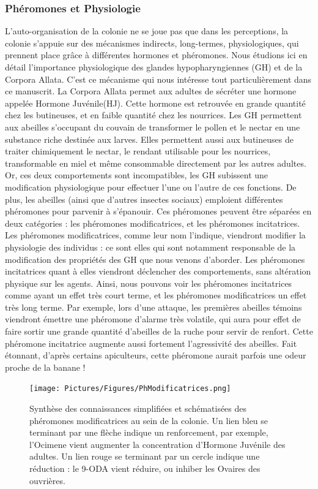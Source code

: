 		\subsubsection{Phéromones et Physiologie}
			\label{subsubPhysio}
			L'auto-organisation de la colonie ne se joue pas que dans les perceptions, la colonie s'appuie sur des mécanismes indirects, long-termes, physiologiques, qui prennent place grâce à différentes hormones et phéromones.  Nous étudions ici en détail l'importance physiologique des glandes hypopharyngiennes (GH) et de la Corpora Allata. C'est ce mécanisme qui nous intéresse tout particulièrement dans ce manuscrit. La Corpora Allata permet aux adultes de sécréter une hormone appelée Hormone Juvénile(HJ). Cette hormone est retrouvée en grande quantité chez les butineuses, et en faible quantité chez les nourrices. Les GH permettent aux abeilles s'occupant du couvain de transformer le pollen et le nectar en une substance riche destinée aux larves. Elles permettent aussi aux butineuses de traiter chimiquement le nectar, le rendant utilisable pour les nourrices, transformable en miel et même consommable directement par les autres adultes. Or, ces deux comportements sont incompatibles, les GH subissent une modification physiologique pour effectuer l'une ou l'autre de ces fonctions. De plus, les abeilles (ainsi que d'autres insectes sociaux) emploient différentes phéromones pour parvenir à s'épanouir. Ces phéromones peuvent être séparées en deux catégories : les phéromones modificatrices, et les phéromones incitatrices. Les phéromones modificatrices, comme leur nom l'indique, viendront modifier la physiologie des individus : ce sont elles qui sont notamment responsable de la modification des propriétés des GH que nous venons d'aborder. Les phéromones incitatrices quant à elles viendront déclencher des comportements, sans altération physique sur les agents. Ainsi, nous pouvons voir les phéromones incitatrices comme ayant un effet très court terme, et les phéromones modificatrices un effet très long terme. Par exemple, lors d'une attaque, les premières abeilles témoins viendront émettre une phéromone d'alarme très volatile, qui aura pour effet de faire sortir une grande quantité d'abeilles de la ruche pour servir de renfort. Cette phéromone incitatrice augmente aussi fortement l'agressivité des abeilles. Fait étonnant, d'après certains apiculteurs, cette phéromone aurait parfois une odeur proche de la banane !
			
			
			
			
			\begin{figure}
				\texttt{[image: Pictures/Figures/PhModificatrices.png]}
				\caption{Synthèse des connaissances simplifiées et schématisées des phéromones modificatrices au sein de la colonie. Un lien bleu se terminant par une flèche indique un renforcement, par exemple, l'Ocimene vient augmenter la concentration d'Hormone Juvénile des adultes. Un lien rouge se terminant par un cercle indique une réduction : le 9-ODA vient réduire, ou inhiber les Ovaires des ouvrières.}
				\label{phMod}
			\end{figure}	
			
